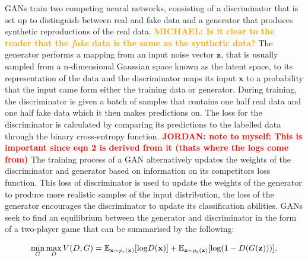 \documentclass[12pt]{iopart}
\newcommand{\jordan}[1]{\textbf{\textcolor{red}{JORDAN: #1}}}
\newcommand{\chris}[1]{\textbf{\textcolor{green}{CHRIS: #1}}}
\newcommand{\michael}[1]{\textbf{\textcolor{orange}{MICHAEL: #1}}}
\begin{document}
%
\acp{GAN} train two competing neural networks, consisting of a discriminator
that is set up to distinguish between real and fake data and a generator that
produces synthetic reproductions of the real data. \michael{Is it clear to the reader that the \textit{fake} data is the same as the synthetic data?} The generator performs a
mapping from an input noise vector $\mathbf{z}$, that is usually sampled from a n-dimensional Gaussian space known as the latent space, to its representation of the
data and the discriminator maps its input $\mathbf{x}$ to a probability that
the input came form either the training data or generator.  During training,
the discriminator is given a batch of samples that contains one half real data
and one half fake data which it then makes predictions on. The loss for the
discriminator is calculated by comparing its predictions to the labelled data
through the binary cross-entropy function. \jordan{note to myself: This is important since eqn 2 is derived from it (thats where the logs come from)} The training process of a \ac{GAN}
alternatively updates the weights of the discriminator and generator based on
information on its competitors loss function. This loss of discriminator is
used to update the weights of the generator to produce more realistic samples
of the input distribution, the loss of the generator encourages the
discriminator to update its classification abilities. GANs seek to find an equilibrium between the generator and discriminator in the form of a two-player game that can be summarised by the following:  

%
\begin{equation}
  \mathop{\text{min}}_{G}  \mathop{\text{max}}_{D} V(D,G) = \mathbb{E}_{\mathbf{x} \sim p_{\text{r}}(\mathbf{x})} [\text{log} D(\mathbf{x})] \\ + \mathbb{E}_{\mathbf{z} \sim p_{\text{z}}(\mathbf{z})} [\text{log}(1-D(G(\mathbf{z})))],
\label{equation:GANloss}
\end{equation}
\end{document}
